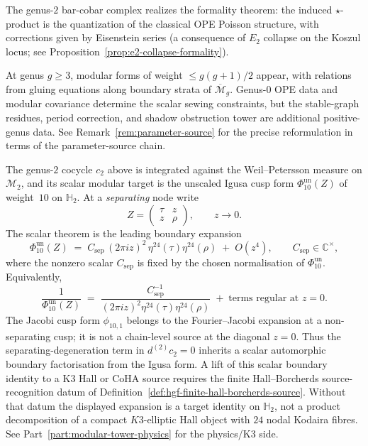 \begin{remark}[Formality]
The genus-$2$ bar-cobar complex realizes the formality theorem: the induced $\star$-product is the quantization of the classical OPE Poisson structure, with corrections given by Eisenstein series
(a consequence of $E_2$ collapse on the Koszul locus; see Proposition~\ref{prop:e2-collapse-formality}).
\end{remark}

\begin{remark}
At genus $g \geq 3$, modular forms of weight $\leq g(g+1)/2$ appear,
with relations from gluing equations along boundary strata of
$\overline{\mathcal{M}}_g$. Genus-$0$ OPE data and modular covariance
determine the scalar sewing constraints, but the stable-graph residues,
period correction, and shadow obstruction tower are additional
positive-genus data. See Remark~\ref{rem:parameter-source} for the
precise reformulation in terms of the parameter-source chain.
\end{remark}

\begin{remark}
\label{rem:hgf-siegel-sepnode}
The genus-$2$ cocycle $c_2$ above is integrated against the Weil--Petersson measure on $\mathcal{M}_2$, and its scalar modular target is the unscaled Igusa cusp form $\Phi_{10}^{\mathrm{un}}(Z)$ of weight~$10$ on $\mathbb{H}_2$. At a \emph{separating} node write
\[
Z=\begin{pmatrix}\tau&z\\z&\rho\end{pmatrix},\qquad z\to0 .
\]
The scalar theorem is the leading boundary expansion
\[
\Phi_{10}^{\mathrm{un}}(Z)
\;=\;
C_{\mathrm{sep}}\,(2\pi i z)^2\,
\eta^{24}(\tau)\eta^{24}(\rho)
\;+\;
O(z^4),
\qquad C_{\mathrm{sep}}\in\mathbb C^\times,
\]
where the nonzero scalar $C_{\mathrm{sep}}$ is fixed by the chosen
normalisation of $\Phi_{10}^{\mathrm{un}}$. Equivalently,
\[
\frac{1}{\Phi_{10}^{\mathrm{un}}(Z)}
\;=\;
\frac{C_{\mathrm{sep}}^{-1}}{(2\pi i z)^2\eta^{24}(\tau)\eta^{24}(\rho)}
\;+\;
\text{terms regular at }z=0.
\]
The Jacobi cusp form $\phi_{10,1}$ belongs to the Fourier--Jacobi
expansion at a non-separating cusp; it is not a chain-level source at
the diagonal $z=0$. Thus the separating-degeneration term in
$d^{(2)}c_2=0$ inherits a scalar automorphic boundary factorisation
from the Igusa form. A lift of this scalar boundary identity to a
K3 Hall or CoHA source requires the finite Hall--Borcherds
source-recognition datum of Definition~\ref{def:hgf-finite-hall-borcherds-source}.
Without that datum the displayed expansion is a target identity on
$\mathbb H_2$, not a product decomposition of a compact
$K3$-elliptic Hall object with $24$ nodal Kodaira fibres. See
Part~\ref{part:modular-tower-physics} for the physics/K3 side.
\end{remark}

